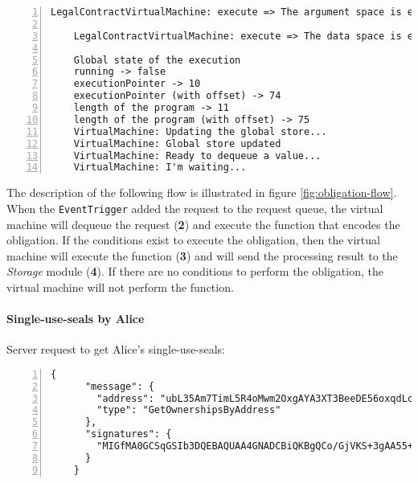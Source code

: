 {\begin{Verbatim}[numbers=left,xleftmargin=1cm,firstnumber=1,breaklines=true,breakanywhere=true,tabsize=2]
    LegalContractVirtualMachine: execute => The argument space is empty
  
    LegalContractVirtualMachine: execute => The data space is empty
  
    Global state of the execution
    running -> false
    executionPointer -> 10
    executionPointer (with offset) -> 74
    length of the program -> 11
    length of the program (with offset) -> 75
    VirtualMachine: Updating the global store...
    VirtualMachine: Global store updated
    VirtualMachine: Ready to dequeue a value...
    VirtualMachine: I'm waiting...
  \end{Verbatim}
}

The description of the following flow is illustrated in figure \ref{fig:obligation-flow}. When the 
\verb|EventTrigger| added the request to the request queue, the virtual machine will dequeue the request 
(\textbf{2}) and execute the function that encodes the obligation. If the conditions exist to execute the 
obligation, then the virtual machine will execute the function (\textbf{3}) and will send the processing 
result to the \textit{Storage} module (\textbf{4}). If there are no conditions to perform the obligation, 
the virtual machine will not perform the function.

\newpage
\paragraph{Single-use-seals by Alice}

Server request to get Alice's single-use-seals:
{
  \small
  \begin{Verbatim}[numbers=left,xleftmargin=1cm,firstnumber=1,breaklines=true,breakanywhere=true,tabsize=2]
    {
      "message": {
        "address": "ubL35Am7TimL5R4oMwm2OxgAYA3XT3BeeDE56oxqdLc=",
        "type": "GetOwnershipsByAddress"
      },
      "signatures": {
        "MIGfMA0GCSqGSIb3DQEBAQUAA4GNADCBiQKBgQCo/GjVKS+3gAA55+kko41yINdOcCLQMSBQyuTTkKHE1mhu/TgOpivM0wLPsSga8hQMr3+v3aR0IF/vfCRf6SdiXmWx/jflmEXtnT6fkGcnV6dGNUpHWXSpwUIDt0N88jfnEqekx4S+KDCKg99sGEeHeT65fKS8lB0gjHMt9AOriwIDAQAB": "MomZTc63z7PfH35c1dL4tjXebcsW+0Zxl0nP1NQdcUFws98DX+bMWI7L0C6IO5lxvkYve4zdio1Crn97FXvngK4aVfiEZEnHOJ0tstq7uQYGErM3DDAABqPq8HH5yoKnLST2LWpO0oD8G/VXvIE6qMT5D34W1Ci0q4uh+7y3EcY="
      }
    }
  \end{Verbatim}
}

